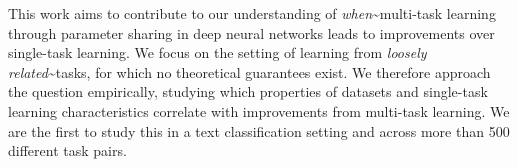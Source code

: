 This work aims to contribute to our understanding of {\em when}{\textasciitilde}multi-task learning through parameter sharing in deep neural networks leads to improvements over single-task learning. We focus on the setting of learning from {\em loosely related}{\textasciitilde}tasks, for which no theoretical guarantees exist. We therefore approach the question empirically, studying which properties of datasets and single-task learning characteristics correlate with improvements from multi-task learning. We are the first to study this in a text classification setting and across more than 500 different task pairs.
